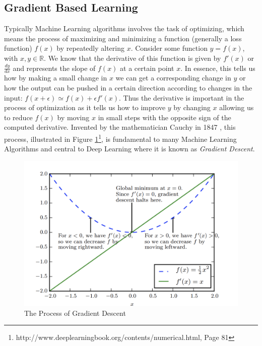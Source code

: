 \documentclass[14pt]{extarticle}
\numberwithin{equation}{section}
\begin{document}
	\subsection{Gradient Based Learning}		
	Typically Machine Learning algorithms involves the task of optimizing, which means the process of maximizing and minimizing a function (generally a loss function) $f(x)$ by repeatedly altering $x$\cite{Goodfellow-et-al-2016}.
	Consider some function $y = f(x)$, with $x, y \in \mathbb{R}$. We know that the derivative of this function is given by $f'(x) $ or $\frac{dy}{dx}$ and represents the slope of $f(x)$ at a certain point $x$. In essence, this tells us how by making a small change in $x$ we can get a corresponding change in $y$ or how the output can be pushed in a certain direction according to changes in the input: $f(x + \epsilon) \simeq f(x) + \epsilon f'(x)$.  Thus the derivative is important in the process of optimization as it tells us how to improve $y$ by changing $x$ allowing us to reduce $f(x)$ by moving $x$ in small steps with the opposite sign of the computed derivative. Invented by the mathematician Cauchy in 1847 \cite{cauchy1847methode}, this process, illustrated in Figure \ref{grad_descent}\footnote{http://www.deeplearningbook.org/contents/numerical.html, Page 81}, is fundamental to many Machine Learning Algorithms and central to Deep Learning where it is known as \textit{Gradient Descent}.
	\begin{figure}[h]
		\vspace{0.2cm}
		\centering
		\includegraphics[scale=0.8]{grad_descent}
		\caption{The Process of Gradient Descent\cite{Goodfellow-et-al-2016}
			\label{grad_descent}}
	\end{figure}
	\pagebreak
\end{document}
